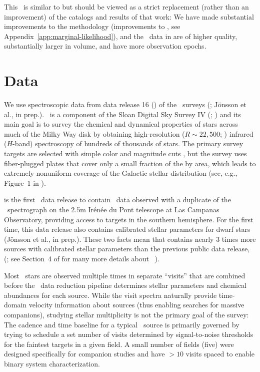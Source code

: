 \documentclass[modern]{aastex63}
\begin{document}
This \documentname\ is similar to \cite{Price-Whelan:2018} but should be viewed
as a strict replacement (rather than an improvement) of the catalogs and results
of that work: We have made substantial improvements to the methodology
(improvements to \thejoker, see Appendix~\ref{app:marginal-likelihood}), and the
\apogee\ data in  are of higher quality, substantially larger in
volume, and have more observation epochs.

\section{Data} \label{sec:data}

We use spectroscopic data from data release 16 () of the \apogee\ surveys
(\citealt{Majewski:2017, DR16}; J\"onsson et al., in prep.).
\apogee\ is a component of the Sloan Digital Sky Survey IV (\sdssiv;
\citealt{Gunn:2006, Blanton:2017}) and its main goal is to survey the chemical
and dynamical properties of stars across much of the Milky Way disk by obtaining
high-resolution ($R \sim 22,500$; \citealt{Wilson:2019}) infrared ($H$-band)
spectroscopy of hundreds of thousands of stars.
The primary survey targets are selected with simple color and magnitude cuts
\citep{Zasowski:2013, Zasowski:2017}, but the survey uses fiber-plugged plates
that cover only a small fraction of the by area, which leads to extremely
nonuniform coverage of the Galactic stellar distribution (see, e.g., Figure~1 in
\citealt{DR16}).

 is the first \sdss\ data release to contain \apogee\ data observed with
a duplicate of the \apogee\ spectrograph on the 2.5m Ir\'en\'ee du Pont
telescope \citep{Bowen:1973} at Las Campanas Observatory, providing access to
targets in the southern hemisphere.
For the first time, this data release also contains calibrated stellar
parameters for dwarf stars (J\"onsson et al., in prep.).
These two facts mean that  contains nearly 3 times more sources with
calibrated stellar parameters than the previous public data release, 
(\citealt{Abolfathi:2017, Holtzman:2018}; see Section~4 of \citealt{DR16} for
many more details about \apogee\ ).

Most \apogee\ stars are observed multiple times in separate ``visits'' that are
combined before the \apogee\ data reduction pipeline \citep{Nidever:2015,
Zamora:2015, ASPCAP} determines stellar parameters and chemical abundances for
each source.
While the visit spectra naturally provide time-domain velocity information about
sources (thus enabling searches for massive companions), studying stellar
multiplicity is not the primary goal of the survey:
The cadence and time baseline for a typical \apogee\ source is primarily
governed by trying to schedule a set number of visits determined by
signal-to-noise thresholds for the faintest targets in a given field.
A small number of fields (five) were designed specifically for companion studies
and have $>10$ visits spaced to enable binary system characterization.
\end{document}
